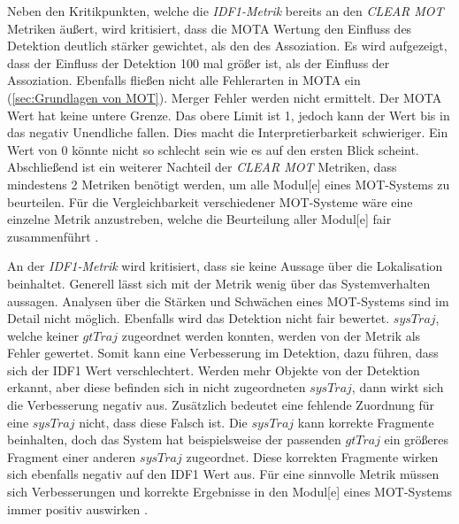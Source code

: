Neben den Kritikpunkten, welche die \textit{\gls{IDF1}-Metrik} bereits an den \textit{\acrshort{CLEAR} \gls{MOT}} Metriken äußert, wird kritisiert, dass die \gls{MOTA} Wertung den Einfluss des \gls{Detektion} deutlich stärker gewichtet, als den des \gls{Assoziation}. Es wird aufgezeigt, dass der Einfluss der \gls{Detektion} 100 mal größer ist, als der Einfluss der \gls{Assoziation}. Ebenfalls fließen nicht alle Fehlerarten in \gls{MOTA} ein (\ref{sec:Grundlagen von MOT}). Merger Fehler werden nicht ermittelt. Der \gls{MOTA} Wert hat keine untere Grenze. Das obere Limit ist 1, jedoch kann der Wert bis in das negativ Unendliche fallen. Dies macht die Interpretierbarkeit schwieriger. Ein Wert von 0 könnte nicht so schlecht sein wie es auf den ersten Blick scheint. Abschließend ist ein weiterer Nachteil der \textit{\acrshort{CLEAR} \gls{MOT}} Metriken, dass mindestens 2 Metriken benötigt werden, um  alle \gls{Modul}[e] eines \gls{MOT}-Systems zu beurteilen. Für die Vergleichbarkeit verschiedener \gls{MOT}-Systeme wäre eine einzelne Metrik anzustreben, welche die Beurteilung aller \gls{Modul}[e] fair zusammenführt \cite{HOTA}.\par

An der \textit{\gls{IDF1}-Metrik} wird kritisiert, dass sie keine Aussage über die \gls{Lokalisation} beinhaltet. Generell lässt sich mit der Metrik wenig über das Systemverhalten aussagen. Analysen über die Stärken und Schwächen eines \gls{MOT}-Systems sind im Detail nicht möglich. Ebenfalls wird das \gls{Detektion} nicht fair bewertet. \(sysTraj\), welche keiner \(gtTraj\) zugeordnet werden konnten, werden von der Metrik als Fehler gewertet. Somit kann eine Verbesserung im \gls{Detektion}, dazu führen, dass sich der \gls{IDF1} Wert verschlechtert. Werden mehr Objekte von der \gls{Detektion} erkannt, aber diese befinden sich in nicht zugeordneten \(sysTraj\), dann wirkt sich die Verbesserung negativ aus. Zusätzlich bedeutet eine fehlende Zuordnung für eine \(sysTraj\) nicht, dass diese Falsch ist. Die \(sysTraj\) kann korrekte Fragmente beinhalten, doch das System hat beispielsweise der passenden \(gtTraj\) ein größeres Fragment einer anderen \(sysTraj\) zugeordnet. Diese korrekten Fragmente wirken sich ebenfalls negativ auf den \gls{IDF1} Wert aus. Für eine sinnvolle Metrik müssen sich Verbesserungen und korrekte Ergebnisse in den \gls{Modul}[e] eines \gls{MOT}-Systems immer positiv auswirken \cite{HOTA}. \par

